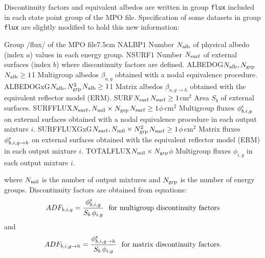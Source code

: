 Discontinuity factors and equivalent albedos are written in group {\tt flux} included in each state point group of the MPO file.
Specification of some datasets in group  {\tt flux} are slightly modified to hold this new information:

\begin{DescriptionEnregistrement}{Group /flux/ of the MPO file}{7.5cm}
\label{tabl:tabiso202}
\IntEnr
  {NALBP}{$1$}
  {Number $N_{\rm alb}$ of physical albedo (index $a$) values in each energy group.}
\IntEnr
  {NSURF}{$1$}
  {Number $N_{\rm surf}$ of external surfaces (index $b$) where discontinuity factors are defined.}
\OptRealEnr
  {ALBEDOG}{$N_{\rm alb},N_{\rm grp}$}{$N_{\rm alb}\ge 1$}{1}
  {Multigroup albedos $\beta_{a,g}$ obtained with a nodal equivalence procedure.}
\OptRealEnr
  {ALBEDOGxG}{$N_{\rm alb},N_{\rm grp}^2$}{$N_{\rm alb}\ge 1$}{1}
  {Matrix albedos $\beta_{a,g\to h}$ obtained with the equivalent reflector model (ERM).}
\OptRealEnr
  {SURF}{$N_{\rm surf}$}{$N_{\rm surf}\ge 1$}{cm$^2$}
  {Area $S_b$ of external surfaces.}
\OptRealEnr
  {SURFFLUX}{$N_{\rm surf},N_{\rm mil}\times N_{\rm grp}$}{$N_{\rm surf}\ge 1$}{$\phi \,$cm$^2$}
  {Multigroup fluxes $\phi^{\rm s}_{b,i,g}$ on external surfaces obtained with a nodal equivalence procedure in each output mixture $i$.}
\OptRealEnr
  {SURFFLUXGxG}{$N_{\rm surf},N_{\rm mil}\times N_{\rm grp}^2$}{$N_{\rm surf}\ge 1$}{$\phi \,$cm$^2$}
  {Matrix fluxes $\phi^{\rm s}_{b,i,g\to h}$ on external surfaces obtained with the equivalent reflector model (ERM) in each output mixture $i$.}
\RealEnr
  {TOTALFLUX}{$N_{\rm mil}\times N_{\rm grp}$}{$\phi$}
  {Multigroup fluxes $\phi_{i,g}$ in each output mixture $i$.}
\end{DescriptionEnregistrement}

\noindent where $N_{\rm mil}$ is the number of output mixtures and $N_{\rm grp}$ is the number of energy groups. Discontinuity factors are obtained from equations:
$$
ADF_{b,i,g}={\phi^{\rm s}_{b,i,g} \over S_b \, \phi_{i,g}} \ \  {\rm for \ multigroup \ discontinuity \ factors}
$$
\noindent and
$$
ADF_{b,i,g\to h}={\phi^{\rm s}_{b,i,g\to h} \over S_b \, \phi_{i,g}} \ \  {\rm for \ matrix \ discontinuity \ factors.}
$$

\clearpage
